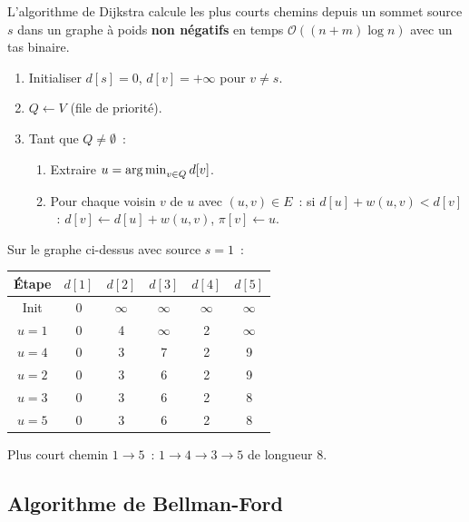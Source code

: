 \begin{theoreme}
L'algorithme de Dijkstra calcule les plus courts chemins depuis un sommet
source $s$ dans un graphe \`a poids \textbf{non n\'egatifs} en temps
$\mathcal{O}((n + m) \log n)$ avec un tas binaire.
\end{theoreme}

\begin{algorithme}[title=\textbf{Algorithme de Dijkstra}]
\begin{enumerate}
  \item Initialiser $d[s] = 0$, $d[v] = +\infty$ pour $v \ne s$.
  \item $Q \leftarrow V$ (file de priorit\'e).
  \item Tant que $Q \ne \emptyset$~:
    \begin{enumerate}
      \item Extraire $u = \operatorname*{arg\,min}_{v \in Q} d[v]$.
      \item Pour chaque voisin $v$ de $u$ avec $(u,v) \in E$~:
        si $d[u] + w(u,v) < d[v]$~:
        $d[v] \leftarrow d[u] + w(u,v)$, $\pi[v] \leftarrow u$.
    \end{enumerate}
\end{enumerate}
\end{algorithme}

\begin{exemple}[Dijkstra]
Sur le graphe ci-dessus avec source $s = 1$~:

\begin{center}
\begin{tabular}{c|ccccc}
  \'Etape & $d[1]$ & $d[2]$ & $d[3]$ & $d[4]$ & $d[5]$ \\
  \hline
  Init & 0 & $\infty$ & $\infty$ & $\infty$ & $\infty$ \\
  $u=1$ & 0 & 4 & $\infty$ & 2 & $\infty$ \\
  $u=4$ & 0 & 3 & 7 & 2 & 9 \\
  $u=2$ & 0 & 3 & 6 & 2 & 9 \\
  $u=3$ & 0 & 3 & 6 & 2 & 8 \\
  $u=5$ & 0 & 3 & 6 & 2 & 8 \\
\end{tabular}
\end{center}

Plus court chemin $1 \to 5$~: $1 \to 4 \to 3 \to 5$ de longueur 8.
\end{exemple}

\subsection{Algorithme de Bellman-Ford}

